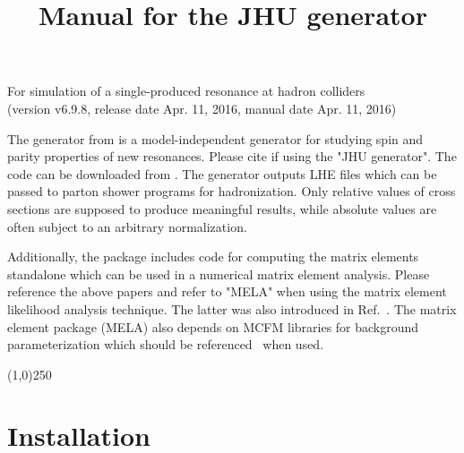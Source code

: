 \documentclass[aps,superscriptaddress,nofootinbib]{revtex4}
\begin{document}
\vspace{0.6cm}

\title{
\large
Manual for the JHU generator
}
\maketitle
\begin{center}
\small
For simulation of a single-produced resonance at hadron colliders \\
(version v6.9.8, release date Apr. 11, 2016, manual date Apr. 11, 2016) \\
\normalsize
\end{center}

\noindent
The generator from \cite{Gao:2010qx,Bolognesi:2012,Anderson:2013,Gritsan:2016} is a model-independent generator for studying spin and parity properties of new resonances.
Please cite \cite{Gao:2010qx,Bolognesi:2012,Anderson:2013,Gritsan:2016} if using the "JHU generator".
The code can be downloaded from \cite{thesite}.
The generator outputs LHE files which can be passed to parton shower programs for hadronization.
Only relative values of cross sections are supposed to produce meaningful results, while absolute values are often subject to an arbitrary normalization.

Additionally, the package includes code for computing the matrix elements standalone which can be used in a numerical matrix element analysis.
Please reference the above papers and refer to "MELA" when using the matrix element likelihood analysis technique.
The latter was also introduced in Ref.~\cite{Chatrchyan:2012ufa}. The matrix element package (MELA) also depends
on MCFM libraries for background parameterization which should be referenced~\cite{Campbell:2010ff} when used.

\vspace{0.5cm}
\begin{center}
\line(1,0){250}
\end{center}
\vspace{0.5cm}
\tableofcontents
\begin{center}
\end{center}
\vspace{0.5cm}


\section{ Installation }
\end{document}
